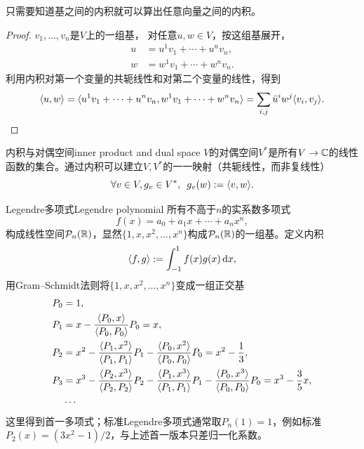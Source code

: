 \begin{theorem}{}{}
	只需要知道基之间的内积就可以算出任意向量之间的内积。
\end{theorem}
\begin{proof}
	$v_1,\ldots,v_n$是$V$上的一组基，%
	对任意$u,w \in V$，按这组基展开，
	\begin{align*}
		u &= u^1v_1 + \cdots + u^nv_n,\\
		w &= w^1v_1 + \cdots + w^nv_n.
	\end{align*}
	利用内积对第一个变量的共轭线性和对第二个变量的线性，得到
	\[
		\langle u,w\rangle = \langle u^1v_1 + \cdots + u^nv_n,w^1v_1 + \cdots + w^nv_n\rangle = \sum_{i,j}\bar u^iw^j\langle v_i,v_j\rangle.
		\qedhere
	\]
\end{proof}
\begin{example}{内积与对偶空间}{inner product and dual space}
	$V$的对偶空间$V^\ast$是所有$V \to \mathbb{C}$的线性函数的集合。通过内积可以建立$V,V^\ast$的一一映射（共轭线性，而非复线性）
	\begin{equation}\label{eq:la-inner-product-dual-map}
		\forall v \in V,g_v \in V^\ast,\enspace g_v(w) := \langle v,w\rangle
.	\end{equation}
\end{example}
\begin{example}{Legendre多项式}{Legendre polynomial}
	所有不高于$n$的实系数多项式
	\[
		f(x) = a_0 + a_1x + \cdots + a_nx^n,
	\]
	构成线性空间$\mathcal{P}_n(\mathbb{R})$，显然$\{1,x,x^2,\ldots,x^n\}$构成$\mathcal{P}_n(\mathbb{R})$的一组基。定义内积
	\begin{equation}\label{eq:la-legendre-inner-product}
		\langle f,g\rangle := \int_{-1}^1f(x)g(x)\mathop{}\!\mathrm{d} x,
	\end{equation}
	用Gram--Schmidt法则将$\{1,x,x^2,\ldots,x^n\}$变成一组正交基%
	\begin{align*}
		P_0 &= 1,\\
		P_1 &= x - \frac{\langle P_0,x\rangle}{\langle P_0,P_0\rangle}P_0 = x,\\
		P_2 &= x^2 - \frac{\langle P_1,x^2\rangle}{\langle P_1,P_1\rangle}P_1 - \frac{\langle P_0,x^2\rangle}{\langle P_0,P_0\rangle}P_0 = x^2 - \frac13,\\
		P_3 &= x^3 - \frac{\langle P_2,x^3\rangle}{\langle P_2,P_2\rangle}P_2 - \frac{\langle P_1,x^3\rangle}{\langle P_1,P_1\rangle}P_1 - \frac{\langle P_0,x^3\rangle}{\langle P_0,P_0\rangle}P_0 = x^3 - \frac35x,\\
		&\cdots
	\end{align*}
	这里得到首一多项式；标准Legendre多项式通常取$P_n(1) = 1$，例如标准$P_2(x) = (3x^2 - 1)/2$，与上述首一版本只差归一化系数。
\end{example}
